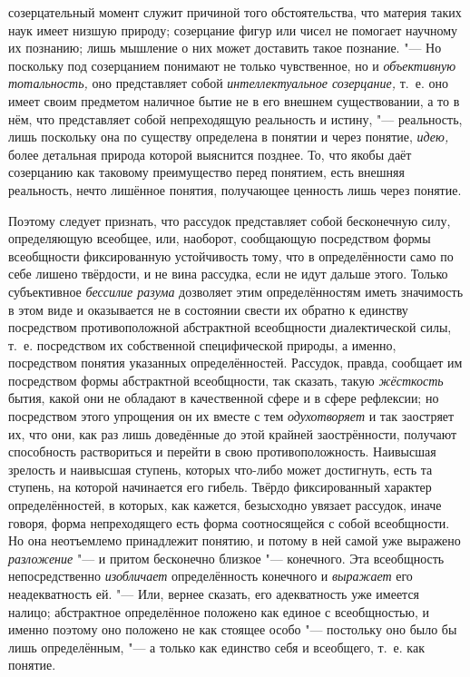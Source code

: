 созерцательный момент служит причиной того обстоятельства, что материя
таких наук имеет низшую природу; созерцание фигур или чисел не помогает
научному их познанию; лишь мышление о них может доставить такое познание.
"--- Но поскольку под созерцанием понимают не только
чувственное, но и {\em объективную
тотальность,} оно представляет собой
{\em интеллектуальное созерцание,}
т.~е. оно имеет своим предметом наличное бытие не в его
внешнем существовании, а то в нём, что представляет собой непреходящую
реальность и истину, "--- реальность, лишь поскольку она по
существу определена в понятии и через понятие,
{\em идею,} более
детальная природа которой выяснится позднее. То, что якобы даёт созерцанию
как таковому преимущество перед понятием, есть внешняя реальность, нечто
лишённое понятия, получающее ценность лишь через понятие.

Поэтому следует признать, что рассудок представляет собой
бесконечную силу, определяющую всеобщее, или, наоборот, сообщающую
посредством формы всеобщности фиксированную устойчивость тому, что в
определённости само по себе лишено твёрдости, и не вина
рассудка, если не идут дальше этого. Только субъективное
{\em бессилие разума}
дозволяет этим определённостям иметь значимость в этом виде и
оказывается не в состоянии свести их обратно к единству посредством
противоположной абстрактной всеобщности диалектической силы, т.~е.
посредством их собственной специфической природы, а именно, посредством
понятия указанных определённостей. Рассудок, правда, сообщает им
посредством формы абстрактной всеобщности, так сказать, такую
{\em жёсткость} бытия,
какой они не обладают в качественной сфере и в сфере рефлексии; но
посредством этого упрощения он их вместе с тем
{\em одухотворяет} и так
заостряет их, что они, как раз лишь доведённые до этой крайней
заострённости, получают способность раствориться и перейти в свою
противоположность. Наивысшая зрелость и наивысшая ступень, которых что-либо
может достигнуть, есть та ступень, на которой начинается его гибель. Твёрдо
фиксированный характер определённостей, в которых, как кажется, безысходно
увязает рассудок, иначе говоря, форма непреходящего есть форма
соотносящейся с собой всеобщности. Но она неотъемлемо принадлежит понятию,
и потому в ней самой уже выражено
{\em разложение} "--- и
притом бесконечно близкое "--- конечного. Эта всеобщность
непосредственно {\em изобличает}
определённость конечного и
{\em выражает} его
неадекватность ей. "--- Или, вернее сказать, его адекватность
уже имеется налицо; абстрактное определённое положено как единое с
всеобщностью, и именно поэтому оно положено не как стоящее особо
"--- постольку оно было бы лишь определённым, "--- а
только как единство себя и всеобщего, т.~е. как понятие.

